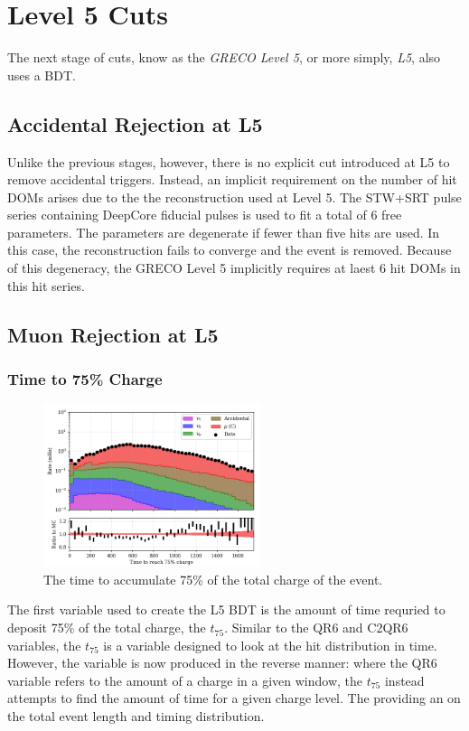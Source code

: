 \section{Level 5 Cuts}
The next stage of cuts, know as the \emph{GRECO Level 5}, or more simply, \emph{L5}, also uses a BDT.

\subsection{Accidental Rejection at L5}
Unlike the previous stages, however, there is no explicit cut introduced at L5 to remove accidental triggers.
Instead, an implicit requirement on the number of hit DOMs arises due to the the reconstruction used at Level 5.
The STW+SRT pulse series containing DeepCore fiducial pulses is used to fit a total of 6 free parameters.
The parameters are degenerate if fewer than five hits are used.
In this case, the reconstruction fails to converge and the event is removed.
Because of this degeneracy, the GRECO Level 5 implicitly requires at laest 6 hit DOMs in this hit series.

\subsection{Muon Rejection at L5}

\subsubsection{Time to 75\% Charge}
\begin{figure}[h]
	\centering
		\includegraphics[width=2.5in]{Time_to_75_Charge_log.png}
		\caption[Time to 75\% Charge]{The time to accumulate 75\% of the total charge of the event.}
	\label{fig:time_to_75}
\end{figure}

The first variable used to create the L5 BDT is the amount of time requried to deposit 75\% of the total charge, the \emph{$t_{75}$}. 
Similar to the QR6 and C2QR6 variables, the $t_{75}$ is a variable designed to look at the hit distribution in time.
However, the variable is now produced in the reverse manner: where the QR6 variable refers to the amount of a charge in a given window, the $t_{75}$ instead attempts to find the amount of time for a given charge level.
The providing an on the total event length and timing distribution.

